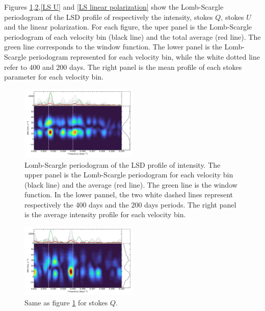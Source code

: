 \documentclass{aa}
\begin{document}
Figures \ref{LS intensity},\ref{LS Q},\ref{LS U} and \ref{LS linear polarization} show the Lomb-Scargle periodogram of the LSD profile of respectively 
the intensity, stokes $Q$, stokes $U$ and the linear polarization. 
For each figure, the uper panel is the Lomb-Scargle periodogram of each velocity bin (black line) and the total average (red line). The green line corresponds to the window function. The lower panel is the Lomb-Scargle periodogram represented for each velocity bin, while the white dotted line refer to 400 and 200 days. The right panel is the mean profile of each stokes parameter for each velocity bin.

\begin{figure}[!h]
    \centering
    \includegraphics[width=0.5\textwidth]{Lomb-Scargle Intensity.pdf}
    \caption{Lomb-Scargle periodogram of the LSD profile of intensity.
    The upper panel is the Lomb-Scargle periodogram for each velocity bin (black line) and the average (red line). The green line is the window function.
    In the lower pannel, the two white dashed lines represent respectively the 400 days and the 200 days periods. The right panel is the average intensity profile for each velocity bin.}
    \label{LS intensity}
\end{figure}

\begin{figure}[!h]
    \centering
    \includegraphics[width=0.5\textwidth]{Lomb-Scargle Stokes Q.pdf}
    \caption{Same as figure \ref{LS intensity} for stokes $Q$. }
    \label{LS Q}
\end{figure}
\end{document}
